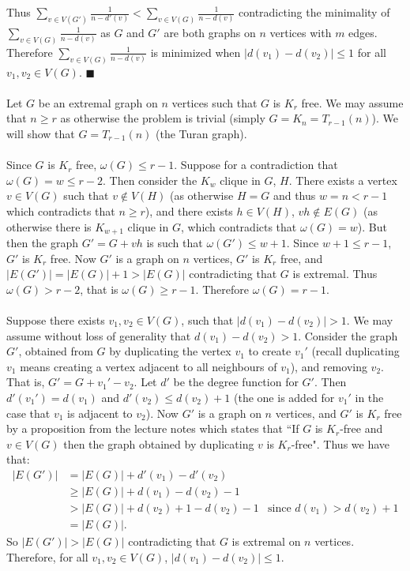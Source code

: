 \documentclass[letterpaper,12pt,oneside,onecolumn]{article}
\begin{document}
Thus $\sum_{v \in V(G')} \frac{1}{n - d'(v)} < \sum_{v\in V(G)} \frac{1}{n - d(v)}$ contradicting the minimality of $\sum_{v\in V(G)} \frac{1}{n - d(v)}$ as $G$ and $G'$ are both graphs on $n$ vertices with $m$ edges. Therefore $\sum_{v\in V(G)} \frac{1}{n - d(v)}$ is minimized when $|d(v_1) - d(v_2)| \leq 1$ for all $v_1, v_2 \in V(G)$. $\blacksquare$
\paragraph{}
Let $G$ be an extremal graph on $n$ vertices such that $G$ is $K_r$ free. We may assume that $n \geq r$ as otherwise the problem is trivial (simply $G = K_n = T_{r-1}(n)$). We will show that $G = T_{r-1}(n)$ (the Turan graph).
\paragraph{}
Since $G$ is $K_r$ free, $\omega(G) \leq r-1$. Suppose for a contradiction that $\omega(G) = w \leq r-2$. Then consider the $K_w$ clique in $G$, $H$. There exists a vertex $v \in V(G)$ such that $v \not\in V(H)$ (as otherwise $H=G$ and thus $w =n < r-1$ which contradicts that $n \geq r$), and there exists $h \in V(H)$, $vh \not\in E(G)$ (as otherwise there is $K_{w+1}$ clique in $G$, which contradicts that $\omega(G) = w$). But then the graph $G' = G + vh$ is such that $\omega(G') \leq w+1$. Since $w + 1 \leq r-1$, $G'$ is $K_r$ free. Now $G'$ is a graph on $n$ vertices, $G'$ is $K_r$ free, and $|E(G')| = |E(G)| + 1 > |E(G)|$ contradicting that $G$ is extremal. Thus $\omega(G) >r-2$, that is $\omega(G) \geq r-1$. Therefore $\omega(G) = r-1$.
\paragraph{}
Suppose there exists $v_1, v_2 \in V(G)$, such that $|d(v_1) - d(v_2)| > 1$. We may assume without loss of generality that $d(v_1) - d(v_2) > 1$. Consider the graph $G'$, obtained from $G$ by duplicating the vertex $v_1$ to create $v_1'$ (recall duplicating $v_1$ means creating a vertex adjacent to all neighbours of $v_1$), and removing $v_2$. That is, $G' = G + v_1' - v_2$. Let $d'$ be the degree function for $G'$. Then $d'(v_1') = d(v_1)$ and $d'(v_2) \leq d(v_2) + 1$ (the one is added for $v_1'$ in the case that $v_1$ is adjacent to $v_2$). Now $G'$ is a graph on $n$ vertices, and $G'$ is $K_r$ free by a proposition from the lecture notes which states that ``If $G$ is $K_r$-free and $v\in V(G)$ then the graph obtained by duplicating $v$ is $K_r$-free". Thus we have that:
\begin{align*}
|E(G')| &= |E(G)| + d'(v_1) - d'(v_2) \\
&\geq |E(G)| + d(v_1) - d(v_2) - 1 \\
&> |E(G)| + d(v_2) + 1 - d(v_2) - 1 &\text{since $d(v_1) > d(v_2) +1$}\\
&= |E(G)|.
\end{align*}
So $|E(G')| > |E(G)|$ contradicting that $G$ is extremal on $n$ vertices. Therefore, for all $v_1, v_2 \in V(G)$, $|d(v_1) - d(v_2)| \leq 1$.
\end{document}
